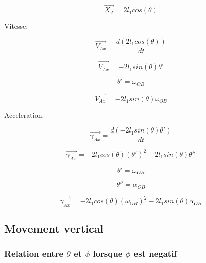 \documentclass{article}
\begin{document}
\begin{equation}
\overrightarrow{X_A} = 2l_1cos(\theta)
\end{equation}

\noindent Vitesse:

\begin{equation}
\overrightarrow{V_{Ax}} = \frac{d(2l_1cos(\theta))}{dt}
\end{equation}

\begin{equation}
\overrightarrow{V_{Ax}} = -2l_1sin(\theta)\theta'
\end{equation}

\begin{equation}
\theta' = \omega_{OB}
\end{equation}

\begin{equation}
\overrightarrow{V_{Ax}} = -2l_1sin(\theta)\omega_{OB}
\end{equation}

\noindent Acceleration:

\begin{equation}
\overrightarrow{\gamma_{Ax}} = \frac{d(-2l_1sin(\theta)\theta')}{dt}
\end{equation}

\begin{equation}
\overrightarrow{\gamma_{Ax}} = -2l_1cos(\theta)(\theta')^2-2l_1sin(\theta)\theta''
\end{equation}

\begin{equation}
\theta' = \omega_{OB}
\end{equation}

\begin{equation}
\theta'' = \alpha_{OB}
\end{equation}

\begin{equation}
\overrightarrow{\gamma_{Ax}} = -2l_1cos(\theta)(\omega_{OB})^2-2l_1sin(\theta)\alpha_{OB}
\end{equation}

\subsection{Movement vertical}
\subsubsection{Relation entre $\theta$ et $\phi$ lorsque $\phi$ est negatif}
\end{document}

